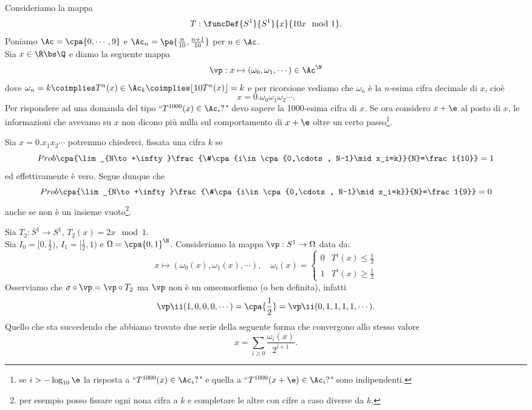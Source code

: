 \begin{example}
Consideriamo la mappa
\[T:\funcDef{S^1}{S^1}{x}{10x \mod 1}.\]
Poniamo $\Ac=\cpa{0,\cdots,9}$ e $\Ac_n=\pa{\frac n{10},\frac{n+1}{10}}$ per $n\in\Ac$.\\
Sia $x\in \R\bs \Q$ e diamo la seguente mappa
\[\vp:x\mapsto(\omega_0,\omega_1,\cdots)\in \Ac^{\N}\]
dove $\omega_n=k\coimplies T^n(x)\in \Ac_k\coimplies \lfloor10 T^n(x)\rfloor=k$ e per ricorsione vediamo che $\omega_n$ \`e la $n$-esima cifra decimale di $x$, cio\`e
\[x=0.\omega_0\omega_1\omega_2\cdots.\]
Per rispondere ad una domanda del tipo ``$T^{1000}(x)\in \Ac_i?$" devo sapere la 1000-esima cifra di $x$. Se ora considero $x+\e$ al posto di $x$, le informazioni che avevamo su $x$ non dicono pi\`u nulla sul comportamento di $x+\e$ oltre un certo passo\footnote{se $i>-\log_{10} \e$ la risposta a ``$T^{1000}(x)\in \Ac_i?$" e quella a ``$T^{1000}(x+\e)\in \Ac_i?$" sono indipendenti.}.
\end{example}
    
\begin{remark}
Sia $x=0.x_1x_2\cdots$ potremmo chiederci, fissata una cifra $k$ se
\[Prob\cpa{\lim_{N\to+\infty}\frac{\#\cpa{i\in \cpa{0,\cdots, N-1}\mid x_i=k}}{N}=\frac1{10}}=1\]
ed effettivamente \`e vero. Segue dunque che
\[Prob\cpa{\lim_{N\to+\infty}\frac{\#\cpa{i\in \cpa{0,\cdots, N-1}\mid x_i=k}}{N}=\frac1{9}}=0\]
anche se non \`e un insieme vuoto\footnote{per esempio posso fissare ogni nona cifra a $k$ e completare le altre con cifre a caso diverse da $k$.}.
\end{remark}

\begin{example}
Sia $T_2:S^1\to S^1$, $T_2(x)=2x\mod 1$.\\
Sia $I_0=[0,\frac12)$, $I_1=[\frac12,1)$ e $\Omega=\cpa{0,1}^\N$. Consideriamo la mappa $\vp:S^1\to \Omega$ data da:
\[x\mapsto (\omega_0(x),\omega_1(x),\cdots),\quad \omega_i(x)=\begin{cases}
0 & T^i(x)\leq \frac12\\
1 & T^i(x)\geq\frac12
\end{cases}\]
Osserviamo che $\sigma\circ \vp=\vp\circ T_2$ ma $\vp$ non \`e un omeomorfismo (o ben definita), infatti
\[\vp\ii(1,0,0,0,\cdots)=\cpa{\frac12}=\vp\ii(0,1,1,1,1,\cdots).\]
Quello che sta succedendo che abbiamo trovato due serie della seguente forma che convergono allo stesso valore
\[x=\sum_{i\geq 0}\frac{\omega_i(x)}{2^{i+1}}.\]
\end{example}

